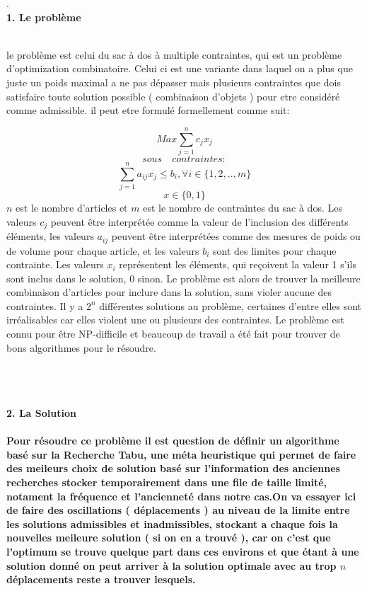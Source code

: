 \documentclass[20pt, a4paper, french]{report}
\title{\bsc{\textbf{\MakeUppercase{ Résumé de la spécification de la Recherche Tabu pour le problème du sac à dos à plusieurs contraintes}}}}
\begin{document}
\maketitle
\newpage
.\\
\bfseries{\Huge 1. Le problème}\\\\
{\large
le problème est celui du  sac à dos à multiple contraintes, qui est un problème d'optimization combinatoire. Celui ci est une variante dans laquel on a plus que juste un poids maximal a ne pas dépasser mais plusieurs contraintes que dois satisfaire toute solution possible ( combinaison d'objets ) pour etre considéré comme admissible. il peut etre formulé formellement  comme suit: 

\[ 
Max \sum_{j=1}^{n} c_{j}x_{j}
\]
\[ sous \quad contraintes: \]
\[
\sum_{j=1}^{n} a_{ij}x_{j} \leq b_{i}, \forall i \in \{1,2,..,m\}
\]
\[
x \in \{0,1\}
\]
\(n\) est le nombre d'articles et \(m\) est le nombre de contraintes du sac à dos. Les valeurs \(c_j\) peuvent
être interprétée comme la valeur de l'inclusion des différents éléments, les valeurs \(a_{ij}\) peuvent être interprétées comme des mesures de poids ou de volume pour chaque article, et les valeurs \(b_i\) sont des limites pour chaque contrainte.
Les valeurs \(x_i\) représentent les éléments, qui reçoivent la valeur 1 s'ils sont inclus dans le solution, 0 sinon. Le problème est alors de trouver la meilleure combinaison d'articles pour
inclure dans la solution, sans violer aucune des contraintes. Il y a \(2^n\) différentes solutions au problème, certaines d'entre elles sont irréalisables car elles violent une ou plusieurs des
contraintes. Le problème est connu pour être NP-difficile et beaucoup de travail a été fait pour
trouver de bons algorithmes pour le résoudre.
\\\\\\\\
}
\bfseries{\Huge 2. La Solution}\\\\
{\large
Pour résoudre ce problème il est question de définir un algorithme basé sur la Recherche Tabu, une méta heuristique qui permet de faire des meileurs choix de solution basé sur l'information des anciennes recherches stocker temporairement dans une file de taille limité, notament la fréquence et l'ancienneté dans notre cas.On va essayer ici de faire des oscillations ( déplacements ) au niveau de la limite entre les solutions admissibles et inadmissibles, stockant a chaque fois la nouvelles meileure solution ( si on en a trouvé ), car on c'est que l'optimum se trouve quelque part dans ces environs et que étant à une solution donné on peut arriver à la solution optimale avec au trop \(n\) déplacements reste a trouver lesquels.\\\\\\
}
\end{document}
